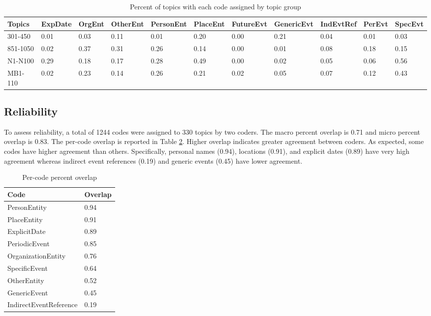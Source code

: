 \documentclass{sig-alternate}
\begin{document}
\begin{table}
\small
\begin{tabular}{| l | l | l | l | l | l | l | l | l | l | l |} \hline
Topics & ExpDate &	OrgEnt&	OtherEnt&	PersonEnt&	PlaceEnt&	FutureEvt&	GenericEvt&	IndEvtRef &	PerEvt&	SpecEvt \\ \hline
301-450	&	0.01&	0.03&	0.11&	0.01&	0.20&	0.00&	0.21&	0.04&	0.01&	0.03 \\ \hline
851-1050	&	0.02&	0.37&	0.31&	0.26&	0.14&	0.00&	0.01&	0.08&	0.18&	0.15 \\ \hline
N1-N100	&	0.29&	0.18&	0.17&	0.28&	0.49&	0.00&	0.02&	0.05&	0.06&	0.56 \\ \hline
MB1-110	&	0.02&	0.23&	0.14&	0.26&	0.21&	0.02&	0.05&	0.07&	0.12&	0.43 \\ \hline
\end{tabular}
\caption{Percent of topics with each code assigned by topic group}
\label{table.codedist}
\end{table}


\subsection{Reliability}

To assess reliability, a total of 1244 codes were assigned to 330 topics by two coders.  The macro percent overlap is 0.71 and  micro percent overlap is 0.83.  The per-code overlap is reported in Table \ref{table.overlap}.  Higher overlap indicates greater agreement between coders. As expected, some codes have higher agreement than others. Specifically, personal names (0.94), locations (0.91), and explicit dates (0.89) have very high agreement whereas indirect event references (0.19) and generic events (0.45) have lower agreement.

\begin{table}
\small
\begin{tabular}{| l | l |} \hline
\bf{Code} & \bf{Overlap}  \\ \hline
PersonEntity & 0.94  \\ \hline
PlaceEntity  & 0.91  \\ \hline
ExplicitDate & 0.89   \\ \hline
PeriodicEvent & 0.85   \\ \hline
OrganizationEntity & 0.76  \\ \hline
SpecificEvent & 0.64  \\ \hline
OtherEntity & 0.52  \\ \hline
GenericEvent & 0.45  \\ \hline
IndirectEventReference & 0.19  \\ \hline
\end{tabular}
\caption{Per-code percent overlap }
\label{table.overlap}
\end{table}
\end{document}
